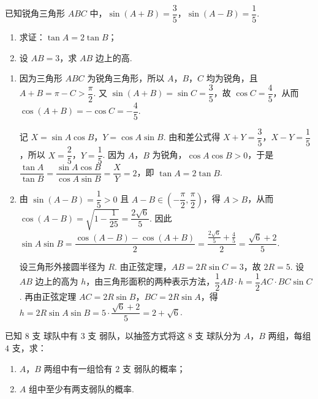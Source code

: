 \begin{problem}
已知锐角三角形 \(ABC\) 中，\(\sin(A+B)=\dfrac{3}{5}\)，\(\sin(A-B)=\dfrac{1}{5}\).

\begin{enumerate}
\item 求证：\(\tan A=2\tan B\)；
\item 设 \(AB=3\)，求 \(AB\) 边上的高.
\end{enumerate}
\end{problem}

\begin{solution}
\begin{enumerate}
\item
因为三角形 \(ABC\) 为锐角三角形，所以 \(A\)，\(B\)，\(C\) 均为锐角，且 \(A+B=\pi-C>\dfrac{\pi}{2}\). 又 \(\sin(A+B)=\sin C=\dfrac{3}{5}\)，故 \(\cos C=\dfrac{4}{5}\)，从而 \(\cos(A+B)=-\cos C=-\dfrac{4}{5}\).

记 \(X=\sin A\cos B\)，\(Y=\cos A\sin B\). 由和差公式得 \(X+Y=\dfrac{3}{5}\)，\(X-Y=\dfrac{1}{5}\)，所以 \(X=\dfrac{2}{5}\)，\(Y=\dfrac{1}{5}\). 因为 \(A\)，\(B\) 为锐角，\(\cos A\cos B>0\)，于是 \(\dfrac{\tan A}{\tan B}=\dfrac{\sin A\cos B}{\cos A\sin B}=\dfrac{X}{Y}=2\)，即 \(\tan A=2\tan B\).

\item
由 \(\sin(A-B)=\dfrac{1}{5}>0\) 且 \(A-B\in\left(-\dfrac{\pi}{2},\dfrac{\pi}{2}\right)\)，得 \(A>B\)，从而 \(\cos(A-B)=\sqrt{1-\dfrac{1}{25}}=\dfrac{2\sqrt6}{5}\). 因此 \(\sin A\sin B=\dfrac{\cos(A-B)-\cos(A+B)}{2}=\dfrac{\frac{2\sqrt6}{5}+\frac{4}{5}}{2}=\dfrac{\sqrt6+2}{5}\).

设三角形外接圆半径为 \(R\). 由正弦定理，\(AB=2R\sin C=3\)，故 \(2R=5\). 设 \(AB\) 边上的高为 \(h\)，由三角形面积的两种表示方法，\(\dfrac{1}{2}AB\cdot h=\dfrac{1}{2}AC\cdot BC\sin C\). 再由正弦定理 \(AC=2R\sin B\)，\(BC=2R\sin A\)，得 \(h=2R\sin A\sin B=5\cdot\dfrac{\sqrt6+2}{5}=2+\sqrt6\).
\end{enumerate}
\end{solution}

\begin{problem}
已知 \(8\text{ 支}\) 球队中有 \(3\text{ 支}\) 弱队，以抽签方式将这 \(8\text{ 支}\) 球队分为 \(A\)，\(B\) 两组，每组 \(4\text{ 支}\)，求：

\begin{enumerate}
\item \(A\)，\(B\) 两组中有一组恰有 \(2\text{ 支}\) 弱队的概率；
\item \(A\) 组中至少有两支弱队的概率.
\end{enumerate}
\end{problem}


